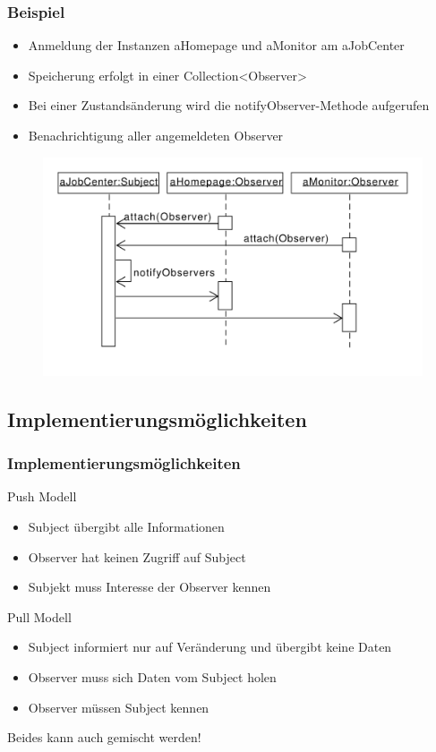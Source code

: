 \begin{frame}
	\frametitle{Beispiel}
	\begin{itemize}
		\item Anmeldung der Instanzen aHomepage und aMonitor am aJobCenter 
		\item Speicherung erfolgt in einer Collection<Observer>
		\item Bei einer Zustandsänderung wird die notifyObserver-Methode aufgerufen
		\item Benachrichtigung aller angemeldeten Observer
	\end{itemize}		 
  	\begin{figure}
		\includegraphics[scale=.4]{paper/observer/observer_sequenz}
	\end{figure}
\end{frame}


\subsection{Implementierungsmöglichkeiten}
\begin{frame}
\frametitle{Implementierungsmöglichkeiten}
		\begin{block}{Push Modell}
		  \begin{itemize}
		  	\item Subject übergibt alle Informationen 
		  	\item Observer hat keinen Zugriff auf Subject
		  	\item Subjekt muss Interesse der Observer kennen
		  \end{itemize}
  		\end{block}
  		\begin{block}{Pull Modell}
  		 \begin{itemize}
		  	\item Subject informiert nur auf Veränderung und übergibt keine Daten
		  	\item Observer muss sich Daten vom Subject holen
		  	\item Observer müssen Subject kennen
		  \end{itemize}  
  		\end{block}
  		Beides kann auch gemischt werden!
\end{frame}

